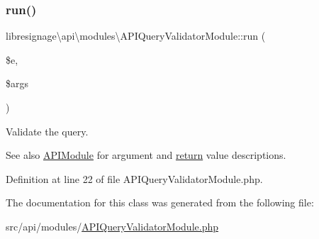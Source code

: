 \subsubsection{\texorpdfstring{run()}{run()}}
{\footnotesize\ttfamily libresignage\textbackslash{}api\textbackslash{}modules\textbackslash{}\+A\+P\+I\+Query\+Validator\+Module\+::run (\begin{DoxyParamCaption}\item[{\hyperlink{classlibresignage_1_1api_1_1APIEndpoint}{A\+P\+I\+Endpoint}}]{\$e,  }\item[{array}]{\$args }\end{DoxyParamCaption})}

Validate the query.

\begin{DoxySeeAlso}{See also}
\hyperlink{classlibresignage_1_1api_1_1APIModule}{A\+P\+I\+Module} for argument and \hyperlink{quota_200-default_8php_ae057f510746f2e7dcbd7d8ccfaf92a45}{return} value descriptions. 
\end{DoxySeeAlso}


Definition at line 22 of file A\+P\+I\+Query\+Validator\+Module.\+php.



The documentation for this class was generated from the following file\+:\begin{DoxyCompactItemize}
\item 
src/api/modules/\hyperlink{APIQueryValidatorModule_8php}{A\+P\+I\+Query\+Validator\+Module.\+php}\end{DoxyCompactItemize}
